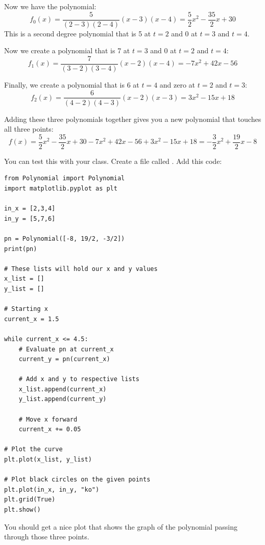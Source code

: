 Now we have the polynomial:
\begin{equation*}
f_0(x) = \frac{5}{(2 - 3)(2 - 4)}(x - 3)(x - 4) = \frac{5}{2}x^2 - \frac{35}{2}x + 30
\end{equation*}
This is a second degree polynomial that is 5 at $t=2$ and 0 at $t=3$ and $t=4$.

Now we create a polynomial that is 7 at $t=3$ and 0 at $t= 2$ and $t=4$:
\begin{equation*}
f_1(x) = \frac{7}{(3 - 2)(3 - 4)}(x - 2)(x - 4) = -7x^2 +42x - 56
\end{equation*}

Finally, we create a polynomial that is 6 at $t=4$ and zero at $t=2$ and $t=3$:
\begin{equation*}
f_2(x) = \frac{6}{(4 - 2)(4 - 3)}(x - 2)(x - 3) = 3x^2 - 15x + 18
\end{equation*}

Adding these three polynomials together gives you a new polynomial that touches all three points:
\begin{equation*}
  f(x) = \frac{5}{2}x^2 - \frac{35}{2}x + 30  - 7x^2 + 42x - 56 + 3x^2 - 15x + 18  = -\frac{3}{2}x^2 + \frac{19}{2}x -8
\end{equation*}

You can test this with your  class. Create a file called . Add this code:
\begin{Verbatim}
from Polynomial import Polynomial
import matplotlib.pyplot as plt

in_x = [2,3,4]
in_y = [5,7,6]

pn = Polynomial([-8, 19/2, -3/2])
print(pn)

# These lists will hold our x and y values
x_list = []
y_list = []

# Starting x
current_x = 1.5

while current_x <= 4.5:
    # Evaluate pn at current_x
    current_y = pn(current_x)

    # Add x and y to respective lists
    x_list.append(current_x)
    y_list.append(current_y)

    # Move x forward
    current_x += 0.05
    
# Plot the curve
plt.plot(x_list, y_list)

# Plot black circles on the given points
plt.plot(in_x, in_y, "ko")
plt.grid(True)
plt.show()
\end{Verbatim}

You should get a nice plot that shows the graph of the polynomial
passing through those three points.

